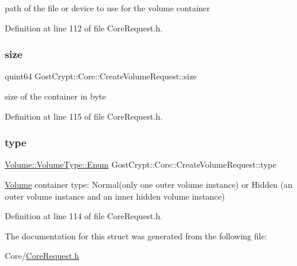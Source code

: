 path of the file or device to use for the volume container 

Definition at line 112 of file Core\+Request.\+h.

\mbox{\label{struct_gost_crypt_1_1_core_1_1_create_volume_request_a3c8d5e758b3118859b41b9f2238fdd9e}} 
\subsubsection{\texorpdfstring{size}{size}}
{\footnotesize\ttfamily quint64 Gost\+Crypt\+::\+Core\+::\+Create\+Volume\+Request\+::size}

size of the container in byte 

Definition at line 115 of file Core\+Request.\+h.

\mbox{\label{struct_gost_crypt_1_1_core_1_1_create_volume_request_aa4c497393df84a5adc5c24dbefd1562b}} 
\subsubsection{\texorpdfstring{type}{type}}
{\footnotesize\ttfamily \hyperlink{struct_gost_crypt_1_1_volume_1_1_volume_type_a7fe1979dab76d4534dcb1e26179d4717}{Volume\+::\+Volume\+Type\+::\+Enum} Gost\+Crypt\+::\+Core\+::\+Create\+Volume\+Request\+::type}

\hyperlink{namespace_gost_crypt_1_1_volume}{Volume} container type\+: Normal(only one outer volume instance) or Hidden (an outer volume instance and an inner hidden volume instance) 

Definition at line 114 of file Core\+Request.\+h.



The documentation for this struct was generated from the following file\+:\begin{DoxyCompactItemize}
\item 
Core/\hyperlink{_core_request_8h}{Core\+Request.\+h}\end{DoxyCompactItemize}
